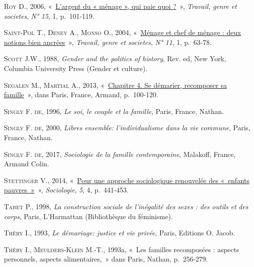 \documentclass[
  12pt,
]{book}
\newlength{\cslhangindent}
\newenvironment{CSLReferences}[2] %
 {\begin{list}{}{%
  \setlength{\itemindent}{0pt}
  \setlength{\leftmargin}{0pt}
  \setlength{\parsep}{0pt}
  \ifodd #1
   \setlength{\leftmargin}{\cslhangindent}
   \setlength{\itemindent}{-1\cslhangindent}
  \fi
  \setlength{\itemsep}{#2\baselineskip}}}
 {\end{list}}
\begin{document}
\begin{CSLReferences}{0}{1}
\textsc{Roy D.}, 2006,
{«~\href{http://www.cairn.info/revue-travail-genre-et-societes-2006-1-page-101.htm}{L'argent
du « ménage », qui paie quoi ?}~»}, \emph{Travail, genre et societes},
\emph{N° 15}, 1, p.~101‑119.

\textsc{Saint-Pol T.}, \textsc{Deney A.}, \textsc{Monso O.}, 2004,
{«~\href{https://www.cairn.info/revue-travail-genre-et-societes-2004-1-page-63.htm}{Ménage
et chef de ménage : deux notions bien ancrées}~»}, \emph{Travail, genre
et societes}, \emph{N° 11}, 1, p.~63‑78.

\textsc{Scott J.W.}, 1988, \emph{Gender and the politics of history},
Rev. ed, New York, Columbia University Press (Gender et culture).

\textsc{Segalen M.}, \textsc{Martial A.}, 2013,
{«~\href{http://www.cairn.info/sociologie-de-la-famille--9782200624743-page-100.htm}{Chapitre
4. Se démarier, recomposer sa famille}~»}, dans Paris, France, Armand,
p.~100‑120.

\textsc{Singly F. de}, 1996, \emph{Le soi, le couple et la famille},
Paris, France, Nathan.

\textsc{Singly F. de}, 2000, \emph{Libres ensemble: l'individualisme
dans la vie commune}, Paris, France, Nathan.

\textsc{Singly F. de}, 2017, \emph{Sociologie de la famille
contemporaine}, Malakoff, France, Armand Colin.

\textsc{Stettinger V.}, 2014,
{«~\href{https://doi.org/10.3917/socio.054.0441}{Pour une approche
sociologique renouvelée des «~enfants pauvres~»}~»}, \emph{Sociologie},
\emph{5}, 4, p.~441‑453.

\textsc{Tabet P.}, 1998, \emph{La construction sociale de l'inégalité
des sexes : des outils et des corps}, Paris, L'Harmattan (Bibliothèque
du féminisme).

\textsc{Théry I.}, 1993, \emph{Le démariage: justice et vie privée},
Paris, Editions O. Jacob.

\textsc{Théry I.}, \textsc{Meulders-Klein M.-T.}, 1993a, {«~Les familles
recomposées : aspects personnels, aspects alimentaires,~»} dans Paris,
Nathan, p.~256‑279.


\end{CSLReferences}
\end{document}
